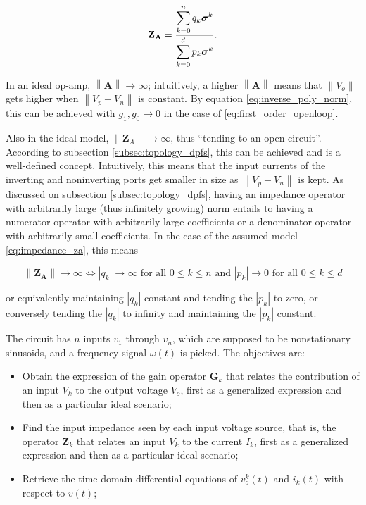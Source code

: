 \begin{equation} \mathbf{Z_A} = \dfrac{\displaystyle\sum_{k=0}^n q_k\boldsymbol{\sigma}^{k}}{\displaystyle\sum_{k=0}^d p_k\boldsymbol{\sigma}^{k}} . \label{eq:impedance_za}\end{equation}

	In an ideal op-amp, $\left\lVert \mathbf{A}\right\rVert \to \infty$; intuitively, a higher $\left\lVert \mathbf{A}\right\rVert$ means that $\left\lVert V_o\right\rVert$ gets higher when $\left\lVert V_p - V_n\right\rVert$ is constant. By equation \eqref{eq:inverse_poly_norm}, this can be achieved with $g_1,g_0 \to 0$ in the case of \eqref{eq:first_order_openloop}.

	Also in the ideal model, $\left\lVert \mathbf{Z}_A\right\rVert \to \infty$, thus ``tending to an open circuit''. According to subsection \eqref{subsec:topology_dpfs}, this can be achieved and is a well-defined concept. Intuitively, this means that the input currents of the inverting and noninverting ports get smaller in size as $\left\lVert V_p - V_n\right\rVert$ is kept. As discussed on subsection \ref{subsec:topology_dpfs}, having an impedance operator with arbitrarily large (thus infinitely growing) norm entails to having a numerator operator with arbitrarily large coefficients or a denominator operator with arbitrarily small coefficients. In the case of the assumed model \eqref{eq:impedance_za}, this means

\begin{equation} \left\lVert \mathbf{Z_A}\right\rVert \to \infty \Leftrightarrow \left\lvert q_k\right\rvert \to \infty \text{ for all } 0 \leq k \leq n \text{ and } \left\lvert p_k\right\rvert \to 0 \text{ for all } 0 \leq k \leq d \end{equation}

	\noindent or equivalently maintaining $\left\lvert q_k\right\rvert$ constant and tending the $\left\lvert p_k\right\rvert$ to zero, or conversely tending the $\left\lvert q_k\right\rvert$ to infinity and maintaining the $\left\lvert p_k\right\rvert$ constant.

	The circuit has $n$ inputs $v_1$ through $v_n$, which are supposed to be nonstationary sinusoids, and a frequency signal $\omega(t)$ is picked. The objectives are:

\begin{itemize}
	\item Obtain the expression of the gain operator $\mathbf{G}_k$ that relates the contribution of an input $V_k$ to the output voltage $V_o$, first as a generalized expression and then as a particular ideal scenario;
	\item Find the input impedance seen by each input voltage source, that is, the operator $\mathbf{Z}_k$ that relates an input $V_k$ to the current $I_k$, first as a generalized expression and then as a particular ideal scenario;
	\item Retrieve the time-domain differential equations of $v_o^k(t)$ and $i_k(t)$ with respect to $v(t)$;
\end{itemize}

